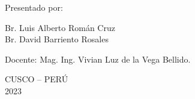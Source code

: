 \begin{titlepage}
\begin{center}
		{\large {Presentado por:}}		
		
		{\large {Br. Luis Alberto Román Cruz	}}\\
		{\large {Br. David Barriento Rosales	}}
		\vspace{0.5cm}
		
		{\large {Docente: Mag. Ing. Vivian Luz de la Vega Bellido.}}
		\vspace{0.5cm}
		
		{\large {CUSCO – PERÚ }}\\
		{\large {2023 }}
		\vspace{0.5cm}
		
		
	\end{center}
\end{titlepage}